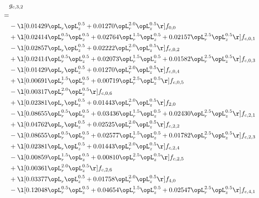 \begin{alignat}{2} 
\label{eq:g_32_0} 
& g_{c,3,2} \nonumber \\ 
 = \\ 
& - \l[  0.01429 \opL_r \opL_z^{0.5} +  0.01270 \opL_r^{2.0} \opL_z^{0.5}  \r] f_{0,0} \nonumber \\ 
& + \l[  0.02414 \opL_r^{0.5} \opL_z^{0.5} +  0.02764 \opL_r^{1.5} \opL_z^{0.5} +  0.02157 \opL_r^{2.5} \opL_z^{0.5}  \r] f_{c,0,1} \nonumber \\ 
& - \l[  0.02857 \opL_r \opL_z^{0.5} +  0.02222 \opL_r^{2.0} \opL_z^{0.5}  \r] f_{c,0,2} \nonumber \\ 
& + \l[  0.02414 \opL_r^{0.5} \opL_z^{0.5} +  0.02073 \opL_r^{1.5} \opL_z^{0.5} +  0.01582 \opL_r^{2.5} \opL_z^{0.5}  \r] f_{c,0,3} \nonumber \\ 
& - \l[  0.01429 \opL_r \opL_z^{0.5} +  0.01270 \opL_r^{2.0} \opL_z^{0.5}  \r] f_{c,0,4} \nonumber \\ 
& + \l[  0.00691 \opL_r^{1.5} \opL_z^{0.5} +  0.00719 \opL_r^{2.5} \opL_z^{0.5}  \r] f_{c,0,5} \nonumber \\ 
& - \l[  0.00317 \opL_r^{2.0} \opL_z^{0.5}  \r] f_{c,0,6} \nonumber \\ 
& + \l[  0.02381 \opL_r \opL_z^{0.5} +  0.01443 \opL_r^{2.0} \opL_z^{0.5}  \r] f_{2,0} \nonumber \\ 
& - \l[  0.08655 \opL_r^{0.5} \opL_z^{0.5} +  0.03436 \opL_r^{1.5} \opL_z^{0.5} +  0.02430 \opL_r^{2.5} \opL_z^{0.5}  \r] f_{c,2,1} \nonumber \\ 
& + \l[  0.04762 \opL_r \opL_z^{0.5} +  0.02525 \opL_r^{2.0} \opL_z^{0.5}  \r] f_{c,2,2} \nonumber \\ 
& - \l[  0.08655 \opL_r^{0.5} \opL_z^{0.5} +  0.02577 \opL_r^{1.5} \opL_z^{0.5} +  0.01782 \opL_r^{2.5} \opL_z^{0.5}  \r] f_{c,2,3} \nonumber \\ 
& + \l[  0.02381 \opL_r \opL_z^{0.5} +  0.01443 \opL_r^{2.0} \opL_z^{0.5}  \r] f_{c,2,4} \nonumber \\ 
& - \l[  0.00859 \opL_r^{1.5} \opL_z^{0.5} +  0.00810 \opL_r^{2.5} \opL_z^{0.5}  \r] f_{c,2,5} \nonumber \\ 
& + \l[  0.00361 \opL_r^{2.0} \opL_z^{0.5}  \r] f_{c,2,6} \nonumber \\ 
& + \l[  0.03377 \opL_r \opL_z^{0.5} +  0.01758 \opL_r^{2.0} \opL_z^{0.5}  \r] f_{4,0} \nonumber \\ 
& - \l[  0.12048 \opL_r^{0.5} \opL_z^{0.5} +  0.04654 \opL_r^{1.5} \opL_z^{0.5} +  0.02547 \opL_r^{2.5} \opL_z^{0.5}  \r] f_{c,4,1} \nonumber \\ 

\end{alignat}
